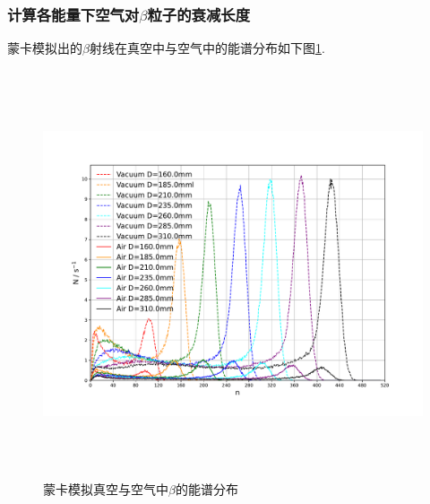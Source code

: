 \documentclass[a4paper]{article}
\begin{document}
\subsubsection{计算各能量下空气对$\beta$粒子的衰减长度}
蒙卡模拟出的$\beta$射线在真空中与空气中的能谱分布如下图\ref{fig:fig11}. 
\begin{figure}[ht]
 \centering
 \includegraphics[height=12cm, width=16cm]{images/phyex6_fig1.pdf}
 \caption{蒙卡模拟真空与空气中$\beta$的能谱分布}
 \label{fig:fig11}
\end{figure}\\\\
\newpage
\end{document}
